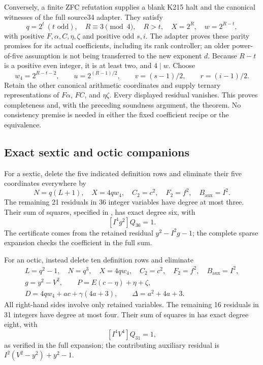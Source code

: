 Conversely, a finite ZFC refutation supplies a blank K215 halt and the
canonical witnesses of the full source34 adapter.  They satisfy
\[
 q=2^t\ (t\text{ odd}),\quad R\equiv3\pmod4,\quad R>t,
 \quad X=2^R,\quad w=2^{R-t},
\]
with positive \(F,\alpha,C,\eta,\zeta\) and positive odd \(s,i\).
The adapter proves these parity promises for its actual coefficients,
including its rank controller; an older power-of-five assumption is not
being transferred to the new exponent \(d\).
Because \(R-t\) is a positive even integer, it is at least two, and
\(4\mid w\).  Choose
\[
 w_4=2^{R-t-2},\qquad u=2^{(R-1)/2},\qquad
 v=(s-1)/2,\qquad r=(i-1)/2.
\]
Retain the other canonical arithmetic coordinates and supply ternary
representations of \(F\alpha\), \(FC\), and \(\eta\zeta\).
Every displayed residual vanishes.  This proves completeness and, with
the preceding soundness argument, the theorem.  No consistency premise
is needed in either the fixed coefficient recipe or the equivalence.

\subsection{Exact sextic and octic companions}

For a sextic, delete the five indicated definition rows and eliminate
their five coordinates everywhere by
\[
 N=q(L+1),\quad X=4qw_4,\quad C_2=c^2,
 \quad F_2=f^2,\quad B_{\mathrm{aux}}=I^2.
\]
The remaining 21 residuals in 36 integer variables have degree at most
three.  Their sum of squares, specified in , has
exact degree six, with
\[
 [I^4g^2]Q_{36}=1.
\]
The certificate comes from the retained residual \(y^2-I^2g-1\);
the complete sparse expansion checks the coefficient in the full sum.

For an octic, instead delete ten definition rows and eliminate
\[
 \begin{gathered}
 L=q^2-1,\quad N=q^3,\quad X=4qw_4,\quad
 C_2=c^2,\quad F_2=f^2,\quad B_{\mathrm{aux}}=I^2,\\
 g=y^2-V^2,\qquad P=E(c-\eta)+\eta+\zeta,\\
 D=4qw_4+ac+\gamma(4a+3),\qquad \Delta=a^2+4a+3.
 \end{gathered}
\]
All right-hand sides involve only retained variables.  The remaining 16
residuals in 31 integers have degree at most four.  Their sum of squares
in  has exact degree eight, with
\[
 [I^4V^4]Q_{31}=1,
\]
as verified in the full expansion; the contributing auxiliary residual
is \(I^2(V^2-y^2)+y^2-1\).

